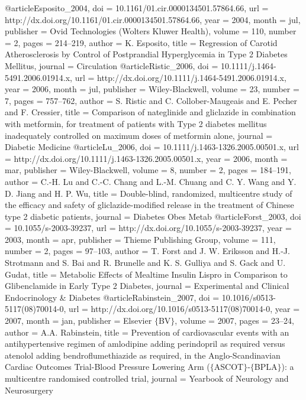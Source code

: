 @article{Esposito_2004,
	doi = {10.1161/01.cir.0000134501.57864.66},
	url = {http://dx.doi.org/10.1161/01.cir.0000134501.57864.66},
	year = 2004,
	month = {jul},
	publisher = {Ovid Technologies (Wolters Kluwer Health)},
	volume = {110},
	number = {2},
	pages = {214--219},
	author = {K. Esposito},
	title = {Regression of Carotid Atherosclerosis by Control of Postprandial Hyperglycemia in Type 2 Diabetes Mellitus},
	journal = {Circulation}
}
@article{Ristic_2006,
	doi = {10.1111/j.1464-5491.2006.01914.x},
	url = {http://dx.doi.org/10.1111/j.1464-5491.2006.01914.x},
	year = 2006,
	month = {jul},
	publisher = {Wiley-Blackwell},
	volume = {23},
	number = {7},
	pages = {757--762},
	author = {S. Ristic and C. Collober-Maugeais and E. Pecher and F. Cressier},
	title = {Comparison of nateglinide and gliclazide in combination with metformin, for treatment of patients with Type 2 diabetes mellitus inadequately controlled on maximum doses of metformin alone},
	journal = {Diabetic Medicine}
}
@article{Lu_2006,
	doi = {10.1111/j.1463-1326.2005.00501.x},
	url = {http://dx.doi.org/10.1111/j.1463-1326.2005.00501.x},
	year = 2006,
	month = {mar},
	publisher = {Wiley-Blackwell},
	volume = {8},
	number = {2},
	pages = {184--191},
	author = {C.-H. Lu and C.-C. Chang and L.-M. Chuang and C. Y. Wang and Y. D. Jiang and H. P. Wu},
	title = {Double-blind, randomized, multicentre study of the efficacy and safety of gliclazide-modified release in the treatment of Chinese type 2 diabetic patients},
	journal = {Diabetes Obes Metab}
}
@article{Forst_2003,
	doi = {10.1055/s-2003-39237},
	url = {http://dx.doi.org/10.1055/s-2003-39237},
	year = 2003,
	month = {apr},
	publisher = {Thieme Publishing Group},
	volume = {111},
	number = {2},
	pages = {97--103},
	author = {T. Forst and J. W. Eriksson and H.-J. Strotmann and S. Bai and R. Brunelle and K. S. Gulliya and S. Gack and U. Gudat},
	title = {Metabolic Effects of Mealtime Insulin Lispro in Comparison to Glibenclamide in Early Type 2 Diabetes},
	journal = {Experimental and Clinical Endocrinology {\&} Diabetes}
}
@article{Rabinstein_2007,
	doi = {10.1016/s0513-5117(08)70014-0},
	url = {http://dx.doi.org/10.1016/s0513-5117(08)70014-0},
	year = 2007,
	month = {jan},
	publisher = {Elsevier $\lbrace$BV$\rbrace$},
	volume = {2007},
	pages = {23--24},
	author = {A.A. Rabinstein},
	title = {Prevention of cardiovascular events with an antihypertensive regimen of amlodipine adding perindopril as required versus atenolol adding bendroflumethiazide as required, in the Anglo-Scandinavian Cardiac Outcomes Trial-Blood Pressure Lowering Arm ($\lbrace$ASCOT$\rbrace$-$\lbrace$BPLA$\rbrace$): a multicentre randomised controlled trial},
	journal = {Yearbook of Neurology and Neurosurgery}
}
